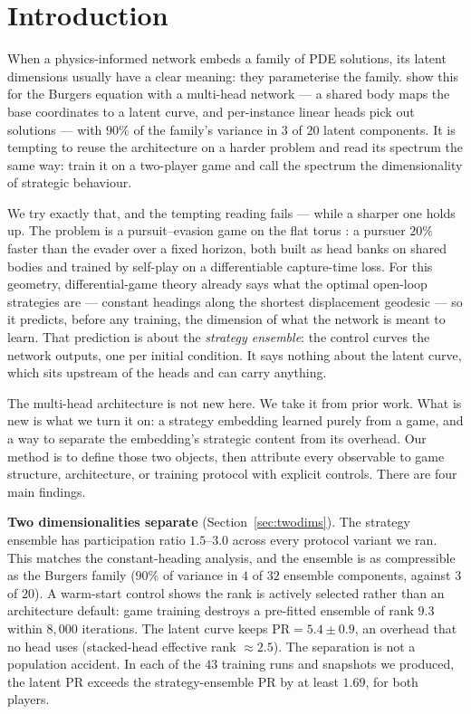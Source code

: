 \documentclass[twoside,11pt]{article}
\newcommand{\PR}{\mathrm{PR}}
\begin{document}
\section{Introduction}
\label{sec:intro}

When a physics-informed network embeds a family of PDE solutions, its
latent dimensions usually have a clear meaning: they parameterise the
family.  \citet{JimenezEmbeddings2026} show this for the Burgers
equation with a multi-head network --- a shared body maps the base
coordinates to a latent curve, and per-instance linear heads pick out
solutions --- with $90\%$ of the family's variance in $3$ of $20$
latent components.  It is tempting to reuse the architecture on a
harder problem and read its spectrum the same way: train it on a
two-player game and call the spectrum the dimensionality of strategic
behaviour.

We try exactly that, and the tempting reading fails --- while a
sharper one holds up.  The problem is a pursuit--evasion game on the
flat torus \citep{Isaacs1965, basar1999dynamic}: a pursuer $20\%$
faster than the evader over a fixed horizon, both built as head banks
on shared bodies and trained by self-play on a differentiable
capture-time loss.  For this geometry, differential-game theory
already says what the optimal open-loop strategies are --- constant
headings along the shortest displacement geodesic
\citep{evans1984differential} --- so it predicts, before any training,
the dimension of what the network is meant to learn.  That prediction
is about the \emph{strategy ensemble}: the control curves the network
outputs, one per initial condition.  It says nothing about the latent
curve, which sits upstream of the heads and can carry anything.

The multi-head architecture is not new here.  We take it from prior
work.  What is new is what we turn it on: a strategy embedding learned
purely from a game, and a way to separate the embedding's strategic
content from its overhead.  Our method is to define those two objects,
then attribute every observable to game structure, architecture, or
training protocol with explicit controls.  There are four main
findings.

\textbf{Two dimensionalities separate} (Section~\ref{sec:twodims}).
The strategy ensemble has participation ratio $1.5$--$3.0$ across
every protocol variant we ran.  This matches the constant-heading
analysis, and the ensemble is as compressible as the Burgers
family ($90\%$ of variance in $4$ of $32$ ensemble components,
against $3$ of $20$).  A warm-start control shows the rank is actively
selected rather than an architecture default: game training destroys
a pre-fitted ensemble of rank $9.3$ within $8{,}000$ iterations.  The
latent curve keeps $\PR = 5.4 \pm 0.9$, an overhead that no head uses
(stacked-head effective rank $\approx 2.5$).  The separation is not a
population accident.  In each of the $43$ training runs and snapshots
we produced, the latent $\PR$ exceeds the strategy-ensemble $\PR$ by
at least $1.69$, for both players.
\end{document}
